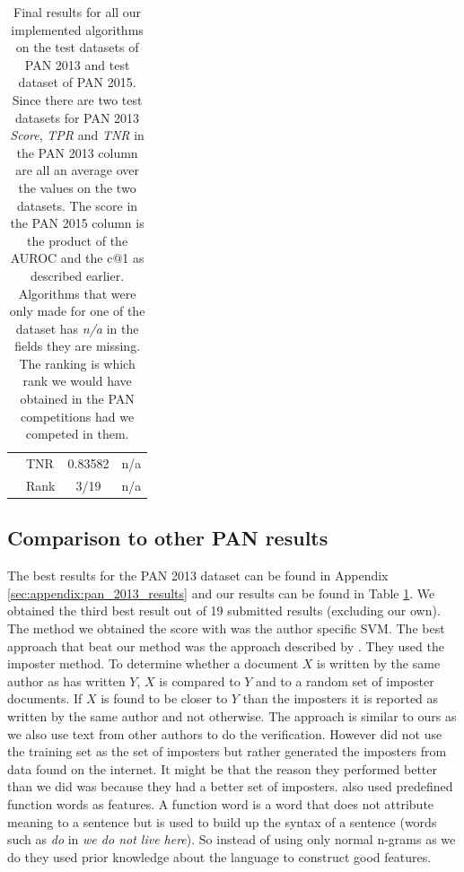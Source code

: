 \begin{table}
\begin{tabular}{ll|cc}
                                  & \gls{TNR} & 0.83582           & n/a               \\
                                  & Rank      & 3/19              & n/a
    \end{tabular}
    \caption{Final results for all our implemented algorithms on the test
        datasets of PAN 2013 and test dataset of PAN 2015. Since there are two
        test datasets for PAN 2013 \textit{Score}, \textit{\gls{TPR}} and
        \textit{\gls{TNR}} in the PAN 2013 column are all an average over the
        values on the two datasets. The score in the PAN 2015 column is the
        product of the \gls{AUROC} and the c@1 as described earlier. Algorithms
        that were only made for one of the dataset has \textit{n/a} in the
        fields they are missing. The ranking is which rank we would have
        obtained in the PAN competitions had we competed in them.}
    \label{tab:all_final_results}
\end{table}

\subsection{Comparison to other PAN results}

The best results for the PAN 2013 dataset can be found in Appendix
\ref{sec:appendix:pan_2013_results} and our results can be found in Table
\ref{tab:all_final_results}. We obtained the third best result out of 19
submitted results (excluding our own). The method we obtained the score with was
the author specific SVM. The best approach that beat our method was the approach
described by \cite{seidman:2013}. They used the imposter method. To determine
whether a document $X$ is written by the same author as has written $Y$, $X$ is
compared to $Y$ and to a random set of imposter documents. If $X$ is found to be
closer to $Y$ than the imposters it is reported as written by the same author
and not otherwise. The approach is similar to ours as we also use text from
other authors to do the verification. However \cite{seidman:2013} did not use
the training set as the set of imposters but rather generated the imposters from
data found on the internet. It might be that the reason they performed better
than we did was because they had a better set of imposters. \cite{seidman:2013}
also used predefined function words as features. A function word is a word that
does not attribute meaning to a sentence but is used to build up the syntax
of a sentence (words such as \textit{do} in \textit{we do not live here}). So
instead of using only normal n-grams as we do they used prior knowledge about
the language to construct good features.

